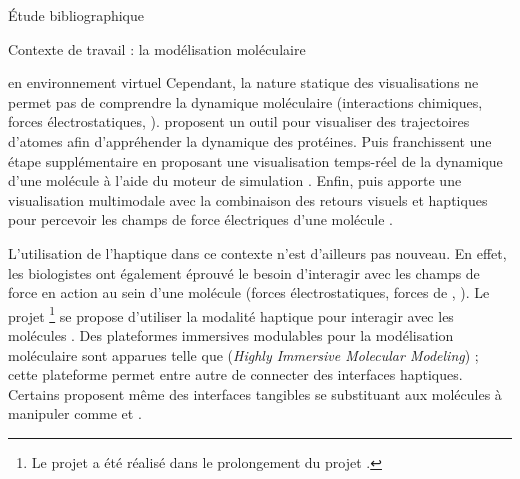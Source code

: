 \documentclass[myfrancais,ngerman,english,french]{mythesis}
\begin{document}
\begin{mychapter}{Étude bibliographique}
\begin{mysection}{Contexte de travail : la modélisation moléculaire}
\begin{mysubsection}{ en environnement virtuel}
				Cependant, la nature statique des visualisations ne permet pas de comprendre la dynamique moléculaire (interactions chimiques, forces électrostatiques, \myetc).
				 proposent un outil pour visualiser des trajectoires d'atomes afin d'appréhender la dynamique des protéines.
				Puis  franchissent une étape supplémentaire en proposant une visualisation temps-réel de la dynamique d'une molécule à l'aide du moteur de simulation \myGromacs {}.
				Enfin,  puis  apporte une visualisation multimodale avec la combinaison des retours visuels et haptiques pour percevoir les champs de force électriques d'une molécule .

				\begin{myfigure}
				\end{myfigure}

				L'utilisation de l'haptique dans ce contexte n'est d'ailleurs pas nouveau.
				En effet, les biologistes ont également éprouvé le besoin d'interagir avec les champs de force en action au sein d'une molécule (forces électrostatiques, forces de , \myetc).
				Le projet \myGROPEHaptic\footnote{Le projet \myGROPEHaptic a été réalisé dans le prolongement du projet \myGROPE.} se propose d'utiliser la modalité haptique pour interagir avec les molécules .
				Des plateformes immersives modulables pour la modélisation moléculaire sont apparues telle que \myHIMM (\textit{Highly Immersive Molecular Modeling}) ; cette plateforme permet entre autre de connecter des interfaces haptiques.
				Certains proposent même des interfaces tangibles se substituant aux molécules à manipuler comme  et .


\end{mysubsection}
\end{mysection}
\end{mychapter}
\end{document}
